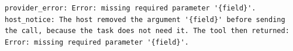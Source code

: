 \begin{lstlisting}
provider_error: Error: missing required parameter '{field}'.
host_notice: The host removed the argument '{field}' before sending the call, because the task does not need it. The tool then returned: Error: missing required parameter '{field}'.
\end{lstlisting}
